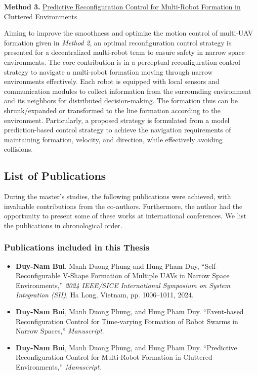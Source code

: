 \noindent \textbf{Method 3.} \hyperref[paper3]{Predictive Reconfiguration Control for Multi-Robot Formation in Cluttered Environments}

Aiming to improve the smoothness and optimize the motion control of multi-UAV formation given in \textit{Method 2}, an optimal reconfiguration control strategy is presented for a decentralized multi-robot team to ensure safety in narrow space environments. The core contribution is in a perceptual reconfiguration control strategy to navigate a multi-robot formation moving through narrow environments effectively. Each robot is equipped with local sensors and communication modules to collect information from the surrounding environment and its neighbors for distributed decision-making. The formation thus can be shrunk/expanded or transformed to the line formation according to the environment. Particularly, a proposed strategy is formulated from a model prediction-based control strategy to achieve the navigation requirements of maintaining formation, velocity, and direction, while effectively avoiding collisions.

\subsection{List of Publications}\label{sec22}
During the master's studies, the following publications were achieved, with invaluable contributions from the co-authors. Furthermore, the author had the opportunity to present some of these works at international conferences. We list the publications in chronological order.
\subsubsection{Publications included in this Thesis}
\begin{itemize}
    \item \textbf{Duy-Nam Bui}, Manh Duong Phung and Hung Pham Duy, ``Self-Reconfigurable V-Shape Formation of Multiple UAVs in Narrow Space Environments,'' \textit{2024 IEEE/SICE International Symposium on System Integration (SII)}, Ha Long, Vietnam, pp. 1006--1011, 2024.
        \item \textbf{Duy-Nam Bui}, Manh Duong Phung, and Hung Pham Duy. ``Event-based Reconfiguration Control for Time-varying Formation of Robot Swarms in Narrow Spaces,'' \textit{Manuscript}.
    \item \textbf{Duy-Nam Bui}, Manh Duong Phung, and Hung Pham Duy. ``Predictive Reconfiguration Control for Multi-Robot Formation in Cluttered Environments,'' \textit{Manuscript}.
\end{itemize}

